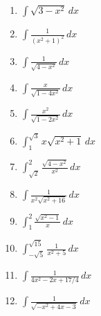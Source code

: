 \documentclass[12pt]{article}
\newif\ifans
\begin{document}
\begin{enumerate}

\item $\int \sqrt{3-x^2}\,dx$ 

\ifans{\fbox{$\frac{3}{2}\arcsin{\left(\frac{x}{\sqrt{3}}\right)}+\frac{1}{2}x\sqrt{3-x^2}+C$}} \fi

\item $\int \frac{1}{(x^2+1)^2}\,dx$ 

\ifans{\fbox{$\frac{1}{2}\tan^{-1}{x}+\frac{x}{2(x^2+1)}+C$}} \fi

\item $\int \frac{1}{\sqrt{4-x^2}}\,dx$ 

\ifans{\fbox{$\arcsin{\left(\frac{x}{2}\right)+C}$}} \fi

\item $\int \frac{x}{\sqrt{1-4x^2}}\,dx$ 

\ifans{\fbox{$-\frac{1}{4}\sqrt{1-4x^2}+C$}} \fi

\item $\int \frac{x^2}{\sqrt{1-2x^2}}\,dx$ 

\ifans{\fbox{$\frac{1}{4\sqrt{2}}\arcsin{(\sqrt{2}x)}-\frac{1}{4}x\sqrt{1-2x^2}+C$}} \fi

\item $\int^{\sqrt{3}}_1 x\sqrt{x^2+1}\,dx$ 

\ifans{\fbox{$\frac{1}{3}(8-2\sqrt{2})$}} \fi

\item $\int^2_{\sqrt{2}} \frac{\sqrt{4-x^2}}{x^2}\,dx$ 

\ifans{\fbox{$1-\frac{\pi}{4}$}} \fi

\item $\int \frac{1}{x^2\sqrt{x^2+16}}\,dx$ 

\ifans{\fbox{$-\frac{\sqrt{x^2+16}}{16x}+C$}} \fi

\item $\int_1^2 \frac{\sqrt{x^2-1}}{x}\,dx$ 

\ifans{\fbox{$\sqrt{3}-\frac{\pi}{3}$}} \fi

\item $\int_{-\sqrt{5}}^{\sqrt{15}} \frac{1}{x^2+5}\,dx$ 

\ifans{\fbox{$\frac{7\pi}{12\sqrt{5}}$}} \fi

\item $\int \frac{1}{4x^2-2x+17/4}\,dx$ 

\ifans{\fbox{$\frac{1}{4}\arctan{\left(x-\frac{1}{4}\right)}+C$}} \fi

\item $\int \frac{1}{\sqrt{-x^2+4x-3}} \,dx$


\end{enumerate}
\end{document}
